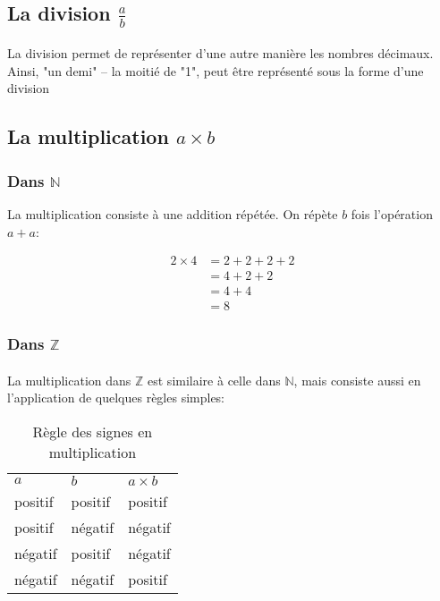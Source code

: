 \documentclass[a4paper]{book}
\begin{document}
    \subsection{La division $\frac{a}{b}$}
    \paragraph{}
    La division permet de représenter d'une autre manière les nombres décimaux. Ainsi, "un demi" -- la moitié de "1", peut être représenté sous la forme d'une division 
    
    \subsection{La multiplication $a \times b$}
    \subsubsection{Dans $\mathds{N}$}
    La multiplication consiste à une addition répétée. On répète $b$ fois l'opération $a + a$: 
    
    \begin{equation*}
        \begin{split}
            2 \times 4 &= 2 + 2 + 2 + 2 \\
            &= 4 + 2 +2 \\
            &= 4 + 4 \\
            &= 8
        \end{split}
    \end{equation*}
    
    \subsubsection{Dans $\mathds{Z}$}
    \paragraph{}
    La multiplication dans $\mathds{Z}$ est similaire à celle dans $\mathds{N}$, mais consiste aussi en l'application de quelques règles simples:
    
    \begin{table}[h]
        \centering
        \begin{tabular}{ll|l}
            $a$ & $b$ & $a \times b$  \\
            positif & positif & positif \\
            positif & négatif & négatif \\
            négatif & positif & négatif \\
            négatif & négatif & positif
        \end{tabular}
        \caption{Règle des signes en multiplication}
        \label{tab:regles_signes_multiplication}
    \end{table}
    
\end{document}
